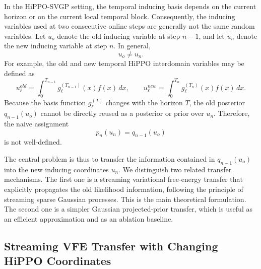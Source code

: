\documentclass[12pt]{article}
\begin{document}
In the HiPPO-SVGP setting, the temporal inducing basis depends on the current horizon
or on the current local temporal block. Consequently, the inducing variables used at two
consecutive online steps are generally not the same random variables. Let \(u_o\) denote
the old inducing variable at step \(n-1\), and let \(u_n\) denote the new inducing
variable at step \(n\). In general,
\begin{equation}
    u_o \neq u_n .
\end{equation}
For example, the old and new temporal HiPPO interdomain variables may be defined as
\begin{equation}
    u_{\ell}^{old}
    =
    \int_0^{T_{n-1}}
    g_\ell^{(T_{n-1})}(x)f(x)\,dx,
    \qquad
    u_{\ell}^{new}
    =
    \int_0^{T_n}
    g_\ell^{(T_n)}(x)f(x)\,dx .
\end{equation}
Because the basis function \(g_\ell^{(T)}\) changes with the horizon \(T\), the old
posterior \(q_{n-1}(u_o)\) cannot be directly reused as a posterior or prior over
\(u_n\). Therefore, the naive assignment
\begin{equation}
    p_n(u_n)=q_{n-1}(u_o)
\end{equation}
is not well-defined.

The central problem is thus to transfer the information contained in \(q_{n-1}(u_o)\)
into the new inducing coordinates \(u_n\). We distinguish two related transfer
mechanisms. The first one is a streaming variational free-energy transfer that explicitly
propagates the old likelihood information, following the principle of streaming sparse
Gaussian processes. This is the main theoretical formulation. The second one is a simpler
Gaussian projected-prior transfer, which is useful as an efficient approximation and as an
ablation baseline.

\subsection{Streaming VFE Transfer with Changing HiPPO Coordinates}
\label{subsec:streaming_vfe_transfer}
\end{document}

